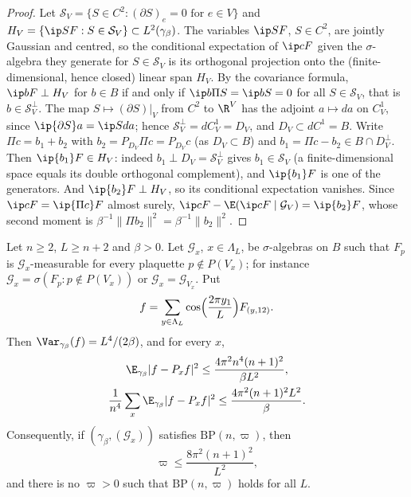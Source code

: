 \begin{proof}
Let $\mathcal S_V=\{S\in C^2:(\partial S)_e=0\text{ for }e\in V\}$ and
$H_V=\{\ip SF:S\in\mathcal S_V\}\subset L^2(\gamma_\beta)$. The variables
$\ip SF$, $S\in C^2$, are jointly Gaussian and centred, so the conditional
expectation of $\ip cF$ given the $\sigma$-algebra they generate for $S\in
\mathcal S_V$ is its orthogonal projection onto the (finite-dimensional,
hence closed) linear span $H_V$. By the covariance formula, $\ip bF\perp
H_V$ for $b\in B$ if and only if $\ip b{\Pi S}=\ip bS=0$ for all $S\in
\mathcal S_V$, that is $b\in\mathcal S_V^\perp$. The map $S\mapsto
(\partial S)\vert_V$ from $C^2$ to $\R^V$ has the adjoint $a\mapsto da$ on
$C^1_V$, since $\ip{\partial S}a=\ip S{da}$; hence $\mathcal S_V^\perp=
dC^1_V=D_V$, and $D_V\subset dC^1=B$. Write $\Pi c=b_1+b_2$ with $b_2=P_{D_V}\Pi c=P_{D_V}c$
(as $D_V\subset B$) and $b_1=\Pi c-b_2\in B\cap D_V^\perp$. Then $\ip{b_1}F
\in H_V$: indeed $b_1\perp D_V=\mathcal S_V^\perp$ gives $b_1\in\mathcal
S_V$ (a finite-dimensional space equals its double orthogonal complement),
and $\ip{b_1}F$ is one of the generators. And $\ip{b_2}F\perp H_V$, so its
conditional expectation vanishes. Since $\ip cF=\ip{\Pi c}F$ almost surely,
$\ip cF-\E(\ip cF\mid\mathcal G_V)=\ip{b_2}F$, whose second moment is
$\beta^{-1}\lVert\Pi b_2\rVert^2=\beta^{-1}\lVert b_2\rVert^2$.
\end{proof}

\begin{theorem}
\label{rD:maxwell}
Let $n\ge2$, $L\ge n+2$ and $\beta>0$. Let $\mathcal G_x$, $x\in\Lambda_L$,
be $\sigma$-algebras on $B$ such that $F_p$ is $\mathcal G_x$-measurable for
every plaquette $p\notin P(V_x)$; for instance $\mathcal G_x=\sigma(F_p:p
\notin P(V_x))$ or $\mathcal G_x=\mathcal G_{V_x}$. Put
\[
f=\sum_{y\in\Lambda_L}\cos\Bigl(\frac{2\pi y_1}L\Bigr)F_{(y,12)} .
\]
Then $\Var_{\gamma_\beta}(f)=L^4/(2\beta)$, and for every $x$,
\begin{gather*}
\E_{\gamma_\beta}\lvert f-P_xf\rvert^2\le\frac{4\pi^2n^4(n+1)^2}{\beta L^2},\\
\frac1{n^4}\sum_x\E_{\gamma_\beta}\lvert f-P_xf\rvert^2\le\frac{4
\pi^2(n+1)^2L^2}\beta .
\end{gather*}
Consequently, if $(\gamma_\beta,(\mathcal G_x))$ satisfies
$\mathrm{BP}(n,\varpi)$, then
\[
\varpi\le\frac{8\pi^2(n+1)^2}{L^2},
\]
and there is no $\varpi>0$ such that $\mathrm{BP}(n,\varpi)$ holds for all
$L$.
\end{theorem}

